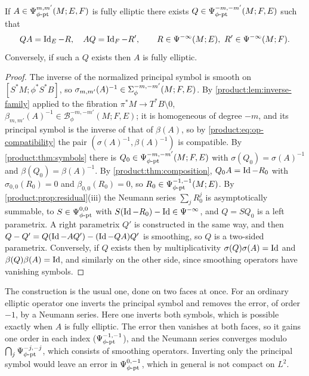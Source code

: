 \begin{theorem}\label{product:thm:parametrix}
If $A\in\Psi^{m,m'}_{\phi\text{-}\mathrm{pt}}(M;E,F)$ is fully elliptic there exists
$Q\in\Psi^{-m,-m'}_{\phi\text{-}\mathrm{pt}}(M;F,E)$ such that
\begin{equation*}
QA=\operatorname{Id}_E-R,\quad AQ=\operatorname{Id}_F-R',\qquad R\in\Psi^{-\infty}(M;E),\
R'\in\Psi^{-\infty}(M;F).
\end{equation*}
Conversely, if such a $Q$ exists then $A$ is fully elliptic.
\end{theorem}

\begin{proof}
The inverse of the normalized principal symbol is smooth on $[S^*M;\phi^*S^*B]$, so
$\sigma_{m,m'}(A)^{-1}\in\Sigma^{-m,-m'}_{\phi}(M;F,E)$. By \cref{product:lem:inverse-family}
applied to the fibration $\pi^*M\longrightarrow T^*B\setminus0$,
$\beta_{m,m'}(A)^{-1}\in\mathcal B^{-m,-m'}_\phi(M;F,E)$; it is homogeneous of degree
$-m$, and its principal symbol is the inverse of that of $\beta(A)$, so by
\eqref{product:eq:op-compatibility} the pair
$(\sigma(A)^{-1},\beta(A)^{-1})$ is compatible. By \cref{product:thm:symbols} there
is $Q_0\in\Psi^{-m,-m'}_{\phi\text{-}\mathrm{pt}}(M;F,E)$ with $\sigma(Q_0)=\sigma(A)^{-1}$ and
$\beta(Q_0)=\beta(A)^{-1}$. By \cref{product:thm:composition}, $Q_0A=\operatorname{Id}-R_0$ with
$\sigma_{0,0}(R_0)=0$ and $\beta_{0,0}(R_0)=0$, so $R_0\in\Psi^{-1,-1}_{\phi\text{-}\mathrm{pt}}(M;E)$. By
\cref{product:prop:residual}(iii) the Neumann series $\sum_jR_0^j$ is
asymptotically summable, to $S\in\Psi^{0,0}_{\phi\text{-}\mathrm{pt}}$ with $S(\operatorname{Id}-R_0)-\operatorname{Id}\in\Psi^{-\infty}$,
and $Q=SQ_0$ is a left parametrix. A right parametrix $Q'$ is constructed in the
same way, and then $Q-Q'=Q(\operatorname{Id}-AQ')-(\operatorname{Id}-QA)Q'$ is smoothing, so $Q$ is a two-sided
parametrix. Conversely, if $Q$ exists then by multiplicativity
$\sigma(Q)\sigma(A)=\operatorname{Id}$ and $\beta(Q)\beta(A)=\operatorname{Id}$, and similarly on the other side,
since smoothing operators have vanishing symbols.
\end{proof}

\begin{discussion}
  The construction is the usual one, done on two faces at once. For an ordinary
  elliptic operator one inverts the principal symbol and removes the error, of
  order $-1$, by a Neumann series. Here one inverts both symbols, which is
  possible exactly when $A$ is fully elliptic. The error then vanishes at both
  faces, so it gains one order in each index ($\Psi^{-1,-1}_{\phi\text{-}\mathrm{pt}}$), and the Neumann
  series converges modulo $\bigcap_j\Psi^{-j,-j}_{\phi\text{-}\mathrm{pt}}$, which consists of smoothing
  operators. Inverting only the principal symbol would leave an error in
  $\Psi^{0,-1}_{\phi\text{-}\mathrm{pt}}$, which in general is not compact on $L^2$.
\end{discussion}

